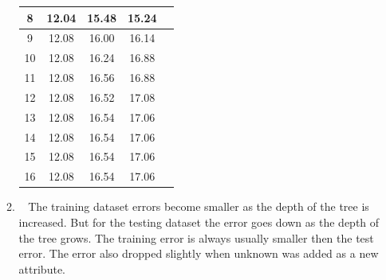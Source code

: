 \documentclass[12pt, fullpage,letterpaper]{article}
\begin{document}
\begin{enumerate}
\begin{enumerate}
\begin{table}[h]
\begin{tabular}{cccc|c}
		8 & 12.04 & 15.48 & 15.24 \\ \hline
		9 & 12.08 & 16.00 & 16.14 \\ \hline
		10 & 12.08 & 16.24 & 16.88 \\ \hline
		11 & 12.08 & 16.56 & 16.88\\ \hline
		12 & 12.08 & 16.52 & 17.08\\ \hline
		13 & 12.08 & 16.54 & 17.06\\ \hline
		14 & 12.08 & 16.54 & 17.06\\ \hline
		15 & 12.08 & 16.54 & 17.06\\ \hline
		16 & 12.08 & 16.54 & 17.06\\ \hline
	\end{tabular}
\end{table}	
	\item~
	\newline The training dataset errors become smaller as the depth of the tree is increased. But for the testing dataset the error goes down as the depth of the tree grows. The training error is always usually smaller then the test error. The error also dropped slightly when unknown was added as a new attribute. 
\end{enumerate}
\end{enumerate}
\end{document}
